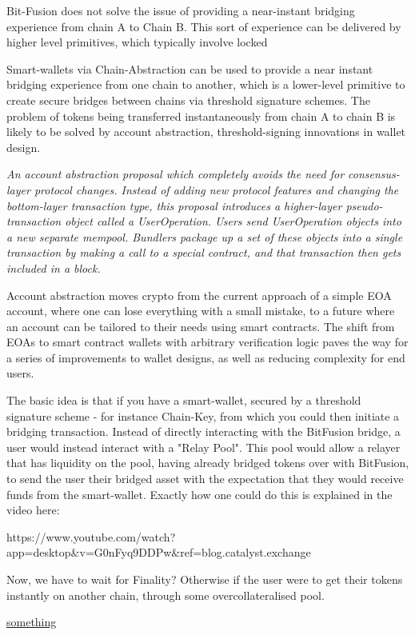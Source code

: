\noindent Bit-Fusion does not solve the issue of providing a near-instant bridging experience from chain A to Chain B. This sort of experience can be delivered by higher level primitives, which typically involve locked

Smart-wallets via Chain-Abstraction can be used to provide a near instant bridging experience from one chain to another, which is a lower-level primitive to create secure bridges between chains via threshold signature schemes. The problem of tokens being transferred instantaneously from chain A to chain B is likely to be solved by account abstraction, threshold-signing innovations in wallet design.


\textit{An account abstraction proposal which completely avoids the need for consensus-layer protocol changes. Instead of adding new protocol features and changing the bottom-layer transaction type, this proposal introduces a higher-layer pseudo-transaction object called a UserOperation. Users send UserOperation objects into a new separate mempool. Bundlers package up a set of these objects into a single transaction by making a call to a special contract, and that transaction then gets included in a block.}

\noindent Account abstraction moves crypto from the current approach of a simple EOA account, where one can lose everything with a small mistake, to a future where an account can be tailored to their needs using smart contracts. The shift from EOAs to smart contract wallets with arbitrary verification logic paves the way for a series of improvements to wallet designs, as well as reducing complexity for end users.

\noindent The basic idea is that if you have a smart-wallet, secured by a threshold signature scheme - for instance Chain-Key, from which you could then  initiate a bridging transaction. 
Instead of directly interacting with the BitFusion bridge, a user would instead interact with a "Relay Pool". This pool would allow a relayer that has liquidity on the pool, having already bridged tokens over with BitFusion, to send the user their bridged asset with the expectation that they would receive funds from the smart-wallet. Exactly how one could do this is explained in the video here: 

https://www.youtube.com/watch?app=desktop&v=G0nFyq9DDPw&ref=blog.catalyst.exchange 

Now, we have to wait for Finality? Otherwise if the user were to get their tokens instantly on another chain, through some overcollateralised pool. 

\href{https://www.youtube.com/watch?app=desktop&v=G0nFyq9DDPw&ref=blog.catalyst.exchange}{something}